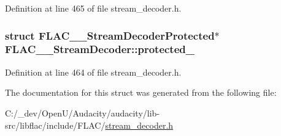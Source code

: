 Definition at line 465 of file stream\+\_\+decoder.\+h.

\subsubsection[{\texorpdfstring{protected\+\_\+}{protected_}}]{\setlength{\rightskip}{0pt plus 5cm}struct {\bf F\+L\+A\+C\+\_\+\+\_\+\+Stream\+Decoder\+Protected}$\ast$ F\+L\+A\+C\+\_\+\+\_\+\+Stream\+Decoder\+::protected\+\_\+}\hypertarget{struct_f_l_a_c_____stream_decoder_a17beb7a75f968592700bddec512f204d}{}\label{struct_f_l_a_c_____stream_decoder_a17beb7a75f968592700bddec512f204d}


Definition at line 464 of file stream\+\_\+decoder.\+h.



The documentation for this struct was generated from the following file\+:\begin{DoxyCompactItemize}
\item 
C\+:/\+\_\+dev/\+Open\+U/\+Audacity/audacity/lib-\/src/libflac/include/\+F\+L\+A\+C/\hyperlink{include_2_f_l_a_c_2stream__decoder_8h}{stream\+\_\+decoder.\+h}\end{DoxyCompactItemize}
